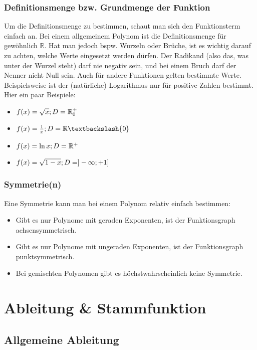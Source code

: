 \documentclass[a4paper]{article}
\begin{document}
\subsubsection{Definitionsmenge bzw. Grundmenge der Funktion}
Um die Definitionsmenge zu bestimmen,
schaut man sich den Funktionsterm einfach an.
Bei einem allgemeinem Polynom ist die Definitionsmenge f\"ur gew\"ohnlich $ \mathbb{R} $.
Hat man jedoch bspw. Wurzeln oder Br\"uche,
ist es wichtig darauf zu achten,
welche Werte eingesetzt werden d\"urfen.
Der Radikand
(also das,
was unter der Wurzel steht)
darf nie negativ sein,
und bei einem Bruch darf der Nenner nicht Null sein.
Auch f\"ur andere Funktionen gelten bestimmte Werte.
Beispielsweise ist der
(nat\"urliche)
Logarithmus nur f\"ur positive Zahlen bestimmt.
Hier ein paar Beispiele:
\begin{itemize}[nosep]
	\item $ f(x) = \sqrt{x} ; \\ D = \mathbb{R}^{+}_{0}  $
	\item $ f(x) = \frac{1}{x} ; \\ D = \mathbb{R} \textbackslash \{ 0 \} $
	\item $ f(x) = \ln{x} ; \\ D = \mathbb{R}^{+} $
	\item $ f(x) = \sqrt{1 - x} ; \\ D = ] -\infty ; +1 ] $
\end{itemize}

\subsubsection{Symmetrie(n)}
Eine Symmetrie kann man bei einem Polynom relativ einfach bestimmen:
\begin{itemize}[nosep]
	\item Gibt es nur Polynome mit geraden Exponenten, ist der Funktionsgraph achsensymmetrisch.
	\item Gibt es nur Polynome mit ungeraden Exponenten, ist der Funktionsgraph punktsymmetrisch.
	\item Bei gemischten Polynomen gibt es h\"ochstwahrscheinlich keine Symmetrie.
\end{itemize}

\newpage
\section{Ableitung \& Stammfunktion}

\subsection{Allgemeine Ableitung}
\end{document}
